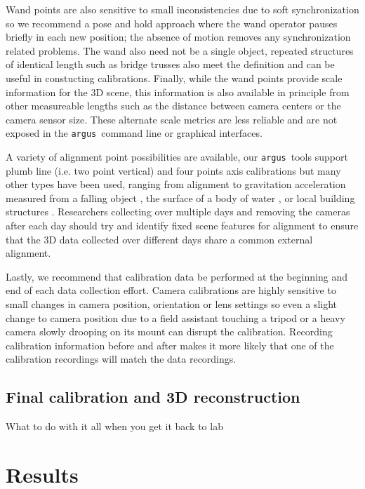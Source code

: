 \documentclass[fleqn,10pt]{wlpeerj}
\newcommand{\argus}{\texttt{argus}}
\begin{document}
Wand points are also sensitive to small inconsistencies due to soft synchronization so we recommend a pose and hold approach where the wand operator pauses briefly in each new position; the absence of motion removes any synchronization related problems. The wand also need not be a single object, repeated structures of identical length such as bridge trusses also meet the definition and can be useful in constucting calibrations. Finally, while the wand points provide scale information for the 3D scene, this information is also available in principle from other measureable lengths such as the distance between camera centers or the camera sensor size. These alternate scale metrics are less reliable and are not exposed in the \argus\ command line or graphical interfaces.

A variety of alignment point possibilities are available, our \argus\ tools support plumb line (i.e. two point vertical) and four points axis calibrations but many other types have been used, ranging from alignment to gravitation acceleration measured from a falling object \citep{Shelton14}, the surface of a body of water \citep{clifton2015}, or local building structures \citep{sholtis2015}. Researchers collecting over multiple days and removing the cameras after each day should try and identify fixed scene features for alignment to ensure that the 3D data collected over different days share a common external alignment.

Lastly, we recommend that calibration data be performed at the beginning and end of each data collection effort. Camera calibrations are highly sensitive to small changes in camera position, orientation or lens settings so even a slight change to camera position due to a field assistant touching a tripod or a heavy camera slowly drooping on its mount can disrupt the calibration. Recording calibration information before and after makes it more likely that one of the calibration recordings will match the data recordings.


\subsection*{Final calibration and 3D reconstruction}
What to do with it all when you get it back to lab





\section*{Results}
\end{document}
